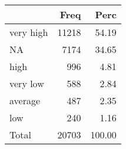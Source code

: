 
\begin{tabular}[t]{lrr}
\toprule
  & Freq & Perc\\
\midrule
very high & 11218 & 54.19\\
NA & 7174 & 34.65\\
high & 996 & 4.81\\
very low & 588 & 2.84\\
average & 487 & 2.35\\
\addlinespace
low & 240 & 1.16\\
Total & 20703 & 100.00\\
\bottomrule
\end{tabular}